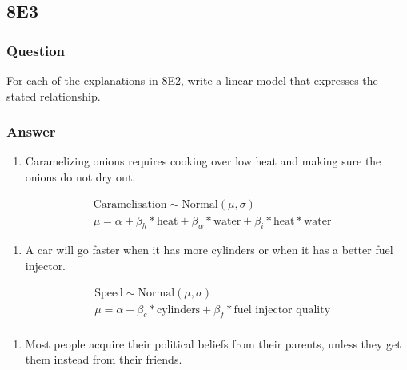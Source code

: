 \documentclass[
]{book}
\providecommand{\tightlist}{%
  \setlength{\itemsep}{0pt}\setlength{\parskip}{0pt}}
\begin{document}
\hypertarget{e3-6}{%
\subsection*{8E3}\label{e3-6}}

\hypertarget{question-77}{%
\subsubsection*{Question}\label{question-77}}

For each of the explanations in 8E2, write a linear model that expresses the stated relationship.

\hypertarget{answer-77}{%
\subsubsection*{Answer}\label{answer-77}}

\begin{enumerate}
\def\labelenumi{\arabic{enumi}.}
\tightlist
\item
  Caramelizing onions requires cooking over low heat and making sure the onions do not dry out.
\end{enumerate}

\[
\begin{aligned}
&\text{Caramelisation} \sim \text{Normal}(\mu,\sigma) \\
&\mu = \alpha + \beta_{h} * \text{heat} + \beta_w * \text{water} + \beta_i * \text{heat}*\text{water} 
\end{aligned}
\]

\begin{enumerate}
\def\labelenumi{\arabic{enumi}.}
\setcounter{enumi}{1}
\tightlist
\item
  A car will go faster when it has more cylinders or when it has a better fuel injector.
\end{enumerate}

\[
\begin{aligned}
&\text{Speed} \sim \text{Normal}(\mu,\sigma) \\
&\mu = \alpha + \beta_{c} * \text{cylinders} + \beta_f * \text{fuel injector quality}  \\
\end{aligned}
\]

\begin{enumerate}
\def\labelenumi{\arabic{enumi}.}
\setcounter{enumi}{2}
\tightlist
\item
  Most people acquire their political beliefs from their parents, unless they get them instead from their friends.
\end{enumerate}
\end{document}
